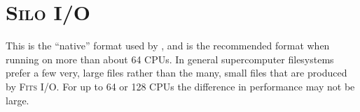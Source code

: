 \documentclass[a4paper,11pt]{report}
\begin{document}
\section{\textsc{Silo} I/O}
This is the ``native'' format used by \pion{}, and is the recommended format when running on more than about 64 CPUs.
In general supercomputer filesystems prefer a few very, large files rather than the many, small files that are produced by \textsc{Fits} I/O.
For up to 64 or 128 CPUs the difference in performance may not be large.





\end{document}

